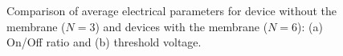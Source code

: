 \begin{figure}
    \centering
    \hfill
    \caption{Comparison of average electrical parameters for device without the membrane ($N = 3$) and devices with the membrane ($N = 6$): (a) On/Off ratio and (b) threshold voltage.}
    \label{fig:avgParamsCfr}
\end{figure}

